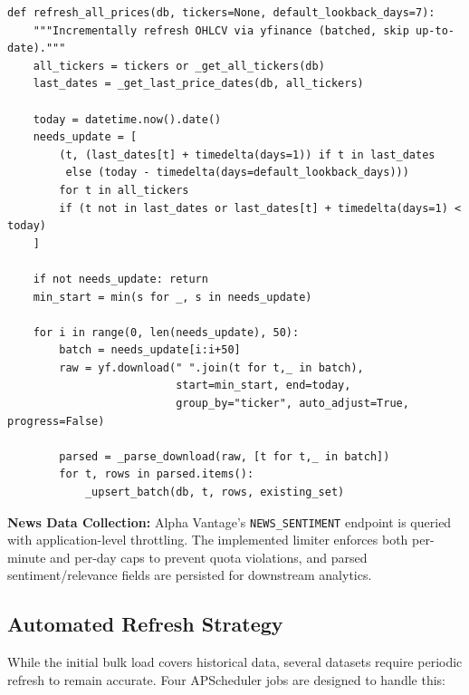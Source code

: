 \begin{lstlisting}[style=pythonstyle, caption={Batch OHLCV Refresh via yfinance (price\_service.py)}, basicstyle=\ttfamily\footnotesize]
def refresh_all_prices(db, tickers=None, default_lookback_days=7):
    """Incrementally refresh OHLCV via yfinance (batched, skip up-to-date)."""
    all_tickers = tickers or _get_all_tickers(db)
    last_dates = _get_last_price_dates(db, all_tickers)

    today = datetime.now().date()
    needs_update = [
        (t, (last_dates[t] + timedelta(days=1)) if t in last_dates
         else (today - timedelta(days=default_lookback_days)))
        for t in all_tickers
        if (t not in last_dates or last_dates[t] + timedelta(days=1) < today)
    ]

    if not needs_update: return
    min_start = min(s for _, s in needs_update)

    for i in range(0, len(needs_update), 50):
        batch = needs_update[i:i+50]
        raw = yf.download(" ".join(t for t,_ in batch),
                          start=min_start, end=today,
                          group_by="ticker", auto_adjust=True, progress=False)

        parsed = _parse_download(raw, [t for t,_ in batch])
        for t, rows in parsed.items():
            _upsert_batch(db, t, rows, existing_set)
\end{lstlisting}

\textbf{News Data Collection:}
Alpha Vantage’s \texttt{NEWS\_SENTIMENT} endpoint is queried with application-level throttling. The implemented limiter enforces both per-minute and per-day caps to prevent quota violations, and parsed sentiment/relevance fields are persisted for downstream analytics.

\subsection{Automated Refresh Strategy}

While the initial bulk load covers historical data, several datasets require periodic refresh to remain accurate. Four APScheduler jobs are designed to handle this:

